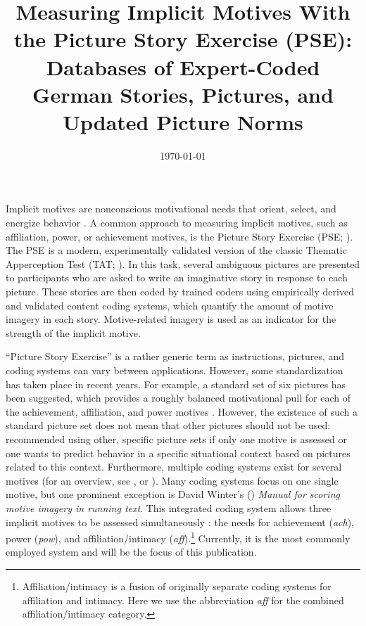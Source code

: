 \documentclass[jou,a4paper]{apa6}\usepackage[]{graphicx}\usepackage[]{color}
\title{Measuring Implicit Motives With the Picture Story Exercise (PSE): Databases of Expert-Coded German Stories, Pictures, and Updated Picture Norms}
\date{\today}
\begin{document}
\maketitle	%
Implicit motives are nonconscious motivational needs that orient, select, and energize behavior \parencite{mcclelland_human_1987}. A common approach to measuring implicit motives, such as affiliation, power, or achievement motives, is the Picture Story Exercise (PSE; ). The PSE is a modern, experimentally validated \parencite{mcclelland_MethodsMeasuringHuman_1958,borsboom_concept_2004} version of the classic Thematic Apperception Test (TAT; ). In this task, several ambiguous pictures are presented to participants who are asked to write an imaginative story in response to each picture. These stories are then coded by trained coders using empirically derived and validated content coding systems, which quantify the amount of motive imagery in each story. Motive-related imagery is used as an indicator for the strength of the implicit motive.

``Picture Story Exercise'' is a rather generic term as instructions, pictures, and coding systems can vary between applications. However, some standardization has taken place in recent years. For example, a standard set of six pictures has been suggested, which provides a roughly balanced motivational pull for each of the achievement, affiliation, and power motives \parencite{schultheiss_MeasuringImplicitMotives_2007}. However, the existence of such a standard picture set does not mean that other pictures should not be used: \textcite{schultheiss_MeasuringImplicitMotives_2007} recommended using other, specific picture sets if only one motive is assessed or one wants to predict behavior in a specific situational context based on pictures related to this context. Furthermore, multiple coding systems exist for several motives (for an overview, see , or ). Many coding systems focus on one single motive, but one prominent exception is David Winter's (\citeyear{winter_ManualScoringMotive_1994}) \emph{Manual for scoring motive imagery in running text}. This integrated coding system allows three implicit motives to be assessed simultaneously \parencite{winter_MeasuringPersonalityDistance_1991}: the needs for achievement (\emph{ach}), power (\emph{pow}), and affiliation/intimacy (\emph{aff}).\footnote{Affiliation/intimacy is a fusion of originally separate coding systems for affiliation and intimacy. Here we use the abbreviation \emph{aff} for the combined affiliation/intimacy category.} Currently, it is the most commonly employed system and will be the focus of this publication.
\end{document}
